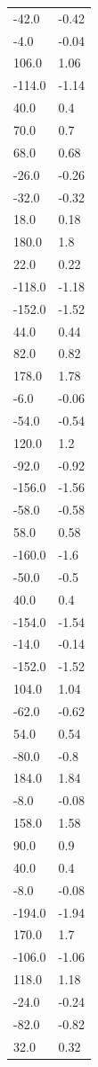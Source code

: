 \begin{longtable}{ll}
-42.0 & -0.42 \\
-4.0 & -0.04 \\
106.0 & 1.06 \\
-114.0 & -1.14 \\
40.0 & 0.4 \\
70.0 & 0.7 \\
68.0 & 0.68 \\
-26.0 & -0.26 \\
-32.0 & -0.32 \\
18.0 & 0.18 \\
180.0 & 1.8 \\
22.0 & 0.22 \\
-118.0 & -1.18 \\
-152.0 & -1.52 \\
44.0 & 0.44 \\
82.0 & 0.82 \\
178.0 & 1.78 \\
-6.0 & -0.06 \\
-54.0 & -0.54 \\
120.0 & 1.2 \\
-92.0 & -0.92 \\
-156.0 & -1.56 \\
-58.0 & -0.58 \\
58.0 & 0.58 \\
-160.0 & -1.6 \\
-50.0 & -0.5 \\
40.0 & 0.4 \\
-154.0 & -1.54 \\
-14.0 & -0.14 \\
-152.0 & -1.52 \\
104.0 & 1.04 \\
-62.0 & -0.62 \\
54.0 & 0.54 \\
-80.0 & -0.8 \\
184.0 & 1.84 \\
-8.0 & -0.08 \\
158.0 & 1.58 \\
90.0 & 0.9 \\
40.0 & 0.4 \\
-8.0 & -0.08 \\
-194.0 & -1.94 \\
170.0 & 1.7 \\
-106.0 & -1.06 \\
118.0 & 1.18 \\
-24.0 & -0.24 \\
-82.0 & -0.82 \\
32.0 & 0.32 \\

\end{longtable}
